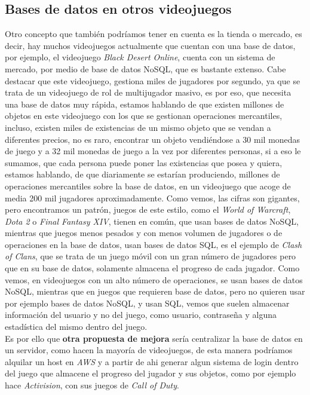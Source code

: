 \documentclass[a4paper]{article}
\begin{document}
\subsection{Bases de datos en otros videojuegos}
Otro concepto que también podríamos tener en cuenta es la tienda o mercado, es decir, hay muchos videojuegos actualmente que cuentan con una base de datos, por ejemplo, el videojuego \textit{Black Desert Online}, cuenta con un sistema de mercado, por medio de base de datos NoSQL, que es bastante extenso.
Cabe destacar que este videojuego, gestiona miles de jugadores por segundo, ya que se trata de un videojuego de rol de multijugador masivo, es por eso, que necesita una base de datos muy rápida, estamos hablando de que existen millones de objetos en este videojuego con los que se gestionan operaciones mercantiles,
incluso, existen miles de existencias de un mismo objeto que se vendan a diferentes precios, no es raro, encontrar un objeto vendiéndose a 30 mil monedas de juego y a 32 mil monedas de juego a la vez por diferentes personas, si a eso le sumamos, que cada persona puede poner las existencias que posea y quiera, estamos hablando,
de que diariamente se estarían produciendo, millones de operaciones mercantiles sobre la base de datos, en un videojuego que acoge de media 200 mil jugadores aproximadamente. Como vemos, las cifras son gigantes, pero encontramos un patrón, juegos de este estilo, como el \textit{World of Warcraft}, \textit{Dota 2} o \textit{Final Fantasy XIV}, tienen en común,
que usan bases de datos NoSQL, mientras que juegos menos pesados y con menos volumen de jugadores o de operaciones en la base de datos, usan bases de datos SQL, es el ejemplo de \textit{Clash of Clans}, que se trata de un juego móvil con un gran número de jugadores pero que en su base de datos, solamente almacena el progreso de cada jugador.
Como vemos, en videojuegos con un alto número de operaciones, se usan bases de datos NoSQL, mientras que en juegos que requieren base de datos, pero no quieren usar por ejemplo bases de datos NoSQL, y usan SQL, vemos que suelen almacenar información del usuario y no del juego, como usuario, contraseña y alguna estadística del mismo dentro del juego.\\
Es por ello que \textbf{otra propuesta de mejora} sería centralizar la base de datos en un servidor, como hacen la mayoría de videojuegos, de esta manera podríamos alquilar un host en \textit{AWS} y a partir de ahi generar algun sistema de login dentro del juego que almacene el progreso del jugador y sus objetos, como por ejemplo hace \textit{Activision}, con sus juegos de \textit{Call of Duty}.
\clearpage
\end{document}
